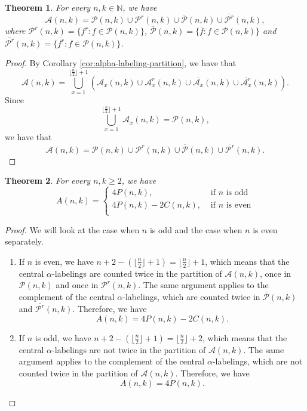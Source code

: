 \documentclass[10pt]{article}
\newtheorem{theorem}{Theorem}
\theoremstyle{definition}
\begin{document}
\begin{theorem}
  \label{thm:principal-partition}
  For every $n, k \in \mathbb{N}$, we have
  $$
  \mathcal{A}(n, k) = \mathcal{P}(n, k) \cup \mathcal{P}^r(n, k) \cup \overline{\mathcal{P}}(n, k) \cup \overline{\mathcal{P}^r}(n, k),
  $$
  where $\mathcal{P}^r(n, k) = \{f^r : f \in \mathcal{P}(n, k)\}$, $\overline{\mathcal{P}}(n, k) = \{\overline{f} : f \in \mathcal{P}(n, k)\}$ and $\overline{\mathcal{P}^r}(n, k) = \{\overline{f^r} : f \in \mathcal{P}(n, k)\}$.
\end{theorem}

\begin{proof}
  By Corollary \ref{cor:alpha-labeling-partition}, we have that
  $$
  \mathcal{A}(n, k) = \bigcup_{x = 1}^{\lfloor \frac{n}{2} \rfloor + 1} \left(\mathcal{A}_x(n, k) \cup \mathcal{A}^r_{x}(n, k) \cup \overline{\mathcal{A}_x}(n, k) \cup \overline{\mathcal{A}^r_{x}}(n, k)\right).
  $$
  Since $$\bigcup_{x = 1}^{\lfloor \frac{n}{2} \rfloor + 1} \mathcal{A}_x(n, k) = \mathcal{P}(n, k),$$ we have that
  $$
  \mathcal{A}(n, k) = \mathcal{P}(n, k) \cup \mathcal{P}^r(n, k) \cup \overline{\mathcal{P}}(n, k) \cup \overline{\mathcal{P}^r}(n, k).
  $$
\end{proof}

\begin{theorem}
  \label{thm:A(n,k)_sum}
  For every $n, k \ge 2$, we have
  $$
  A(n, k) =
  \begin{cases}
    4 P(n, k) ,& \text{ if } n \text{ is odd} \\
    4 P(n, k) - 2 C(n, k) ,& \text{ if } n \text{ is even}
    \\
  \end{cases}
  $$
\end{theorem}

\begin{proof}
  We will look at the case when $n$ is odd and the case when $n$ is even separately.
  \begin{enumerate}
    \item If $n$ is even, we have $n + 2 - (\lfloor \frac{n}{2} \rfloor + 1) = \lfloor \frac{n}{2} \rfloor + 1$, which means that the central $\alpha$-labelings are counted twice in the partition of $\mathcal{A}(n, k)$, once in $\mathcal{P}(n, k)$ and once in $\mathcal{P}^r(n, k)$. The same argument applies to the complement of the central $\alpha$-labelings, which are counted twice in $\overline{\mathcal{P}}(n, k)$ and $\overline{\mathcal{P}^r}(n, k)$. Therefore, we have
      $$
      A(n, k) = 4 P(n, k) - 2 C(n, k).
      $$

    \item If $n$ is odd, we have $n + 2 - (\lfloor \frac{n}{2} \rfloor + 1) = \lfloor \frac{n}{2} \rfloor + 2$, which means that the central $\alpha$-labelings are not twice in the partition of $\mathcal{A}(n, k)$. The same argument applies to the complement of the central $\alpha$-labelings, which are not counted twice in the partition of $\mathcal{A}(n, k)$. Therefore, we have
      $$
      A(n, k) = 4 P(n, k).
      $$
  \end{enumerate}
\end{proof}
\end{document}
